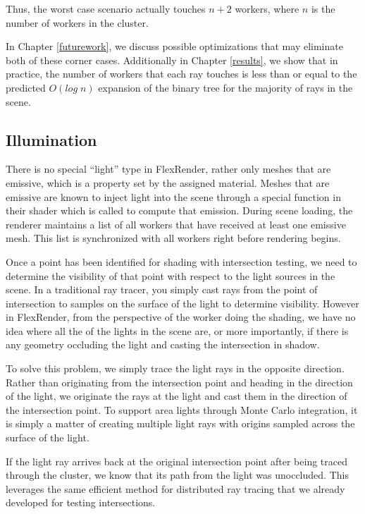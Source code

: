 \documentclass[12pt]{ucthesis}
\begin{document}
Thus, the worst case scenario actually touches $n + 2$ workers, where $n$ is the
number of workers in the cluster.

In Chapter \ref{futurework}, we discuss possible optimizations that may eliminate
both of these corner cases. Additionally in Chapter \ref{results}, we show that
in practice, the number of workers that each ray touches is less than or equal
to the predicted $O(log\;n)$ expansion of the binary tree for the majority
of rays in the scene.

\subsection{Illumination}
\label{illumination}

There is no special ``light'' type in FlexRender, rather only meshes that are
emissive, which is a property set by the assigned material. Meshes that are
emissive are known to inject light into the scene through a special function in
their shader which is called to compute that emission. During scene loading,
the renderer maintains a list of all workers that have received at least one
emissive mesh. This list is synchronized with all workers right before
rendering begins.

Once a point has been identified for shading with intersection testing, we
need to determine the visibility of that point with respect to the light sources
in the scene. In a traditional ray tracer, you simply cast rays from the point
of intersection to samples on the surface of the light to determine visibility.
However in FlexRender, from the perspective of the worker doing the shading,
we have no idea where all the of the lights in the scene are, or more importantly,
if there is any geometry occluding the light and casting the intersection in
shadow.

To solve this problem, we simply trace the light rays in the opposite direction.
Rather than originating from the intersection point and heading in the
direction of the light, we originate the rays at the light and cast them in the
direction of the intersection point. To support area lights through Monte Carlo
integration, it is simply a matter of creating multiple light rays with origins
sampled across the surface of the light.

If the light ray arrives back at the original intersection point after being
traced through the cluster, we know that its path from the light was unoccluded.
This leverages the same efficient method for distributed ray tracing that we
already developed for testing intersections.
\end{document}
